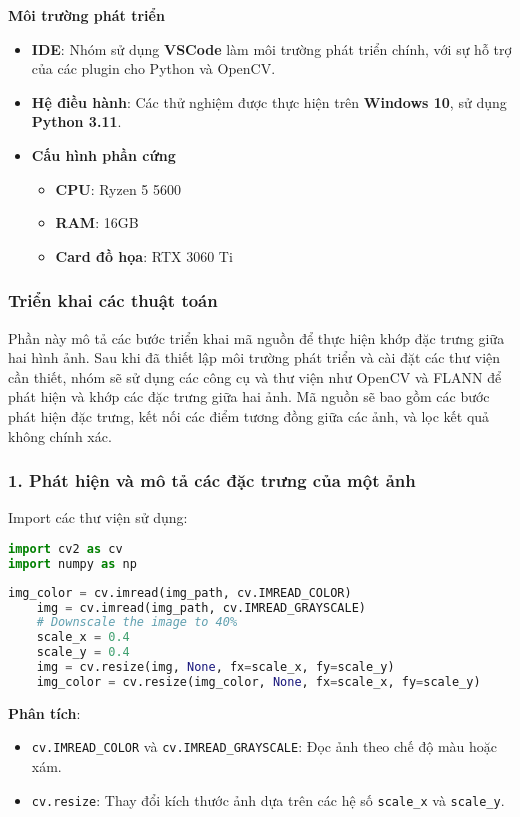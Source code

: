 \textbf{Môi trường phát triển}
\begin{itemize}
	\item \textbf{IDE}: Nhóm sử dụng \textbf{VSCode} làm môi trường phát triển chính, với sự hỗ trợ của các plugin cho Python và OpenCV.
	\item \textbf{Hệ điều hành}: Các thử nghiệm được thực hiện trên \textbf{Windows 10}, sử dụng \textbf{Python 3.11}.
	\item \textbf{Cấu hình phần cứng}
	\begin{itemize}
		\item \textbf{CPU}: Ryzen 5 5600
		\item \textbf{RAM}: 16GB
		\item \textbf{Card đồ họa}: RTX 3060 Ti
	\end{itemize}
\end{itemize}

\subsubsection{Triển khai các thuật toán}
Phần này mô tả các bước triển khai mã nguồn để thực hiện khớp đặc trưng giữa hai hình ảnh. Sau khi đã thiết lập môi trường phát triển và cài đặt các thư viện cần thiết, nhóm sẽ sử dụng các công cụ và thư viện như OpenCV và FLANN để phát hiện và khớp các đặc trưng giữa hai ảnh. Mã nguồn sẽ bao gồm các bước phát hiện đặc trưng, kết nối các điểm tương đồng giữa các ảnh, và lọc kết quả không chính xác.
\subsubsection*{1. Phát hiện và mô tả các đặc trưng của một ảnh}
Import các thư viện sử dụng:
\begin{lstlisting}[language=Python]
import cv2 as cv
import numpy as np
\end{lstlisting}

\begin{lstlisting}[language=Python]
	img_color = cv.imread(img_path, cv.IMREAD_COLOR)
	img = cv.imread(img_path, cv.IMREAD_GRAYSCALE)
	# Downscale the image to 40%
	scale_x = 0.4
	scale_y = 0.4
	img = cv.resize(img, None, fx=scale_x, fy=scale_y)
	img_color = cv.resize(img_color, None, fx=scale_x, fy=scale_y)
\end{lstlisting}

\textbf{Phân tích}:
\begin{itemize}
	\item \texttt{cv.IMREAD\_COLOR} và \texttt{cv.IMREAD\_GRAYSCALE}: Đọc ảnh theo chế độ màu hoặc xám.
	\item \texttt{cv.resize}: Thay đổi kích thước ảnh dựa trên các hệ số \texttt{scale\_x} và \texttt{scale\_y}.
\end{itemize}

